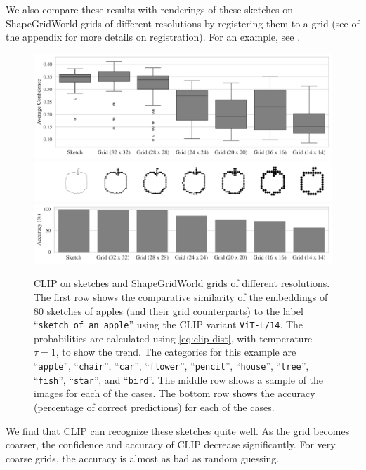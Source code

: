 We also compare these results with renderings of these sketches on ShapeGridWorld grids of different resolutions by registering them to a grid (see  of the appendix for more details on registration).
For an example, see .
\begin{figure}[h]
    \centering
    \includegraphics[width=\textwidth]{images/grid_comparison.pdf}
    \includegraphics[width=\textwidth]{images/grid_comparison_images.png}
    \includegraphics[width=\textwidth]{images/grid_comparison_accuracy.pdf}
    \caption[CLIP on sketches and ShapeGridWorld grids of different resolutions.]{CLIP on sketches and ShapeGridWorld grids of different resolutions.
    The first row shows the comparative similarity of the embeddings of \(80\) sketches of apples (and their grid counterparts) to the label ``\texttt{sketch of an apple}'' using the CLIP variant \texttt{ViT-L/14}.
    The probabilities are calculated using \eqref{eq:clip-dist}, with temperature \(\tau = 1\), to show the trend.
    The categories for this example are ``\texttt{apple}'', ``\texttt{chair}'', ``\texttt{car}'', ``\texttt{flower}'', ``\texttt{pencil}'', ``\texttt{house}'', ``\texttt{tree}'', ``\texttt{fish}'', ``\texttt{star}'', and ``\texttt{bird}''.
    The middle row shows a sample of the images for each of the cases.
    The bottom row shows the accuracy (percentage of correct predictions) for each of the cases.
    }
    \label{fig:clip-sketches}
\end{figure}
We find that CLIP can recognize these sketches quite well.
As the grid becomes coarser, the confidence and accuracy of CLIP decrease significantly.
For very coarse grids, the accuracy is almost as bad as random guessing.

